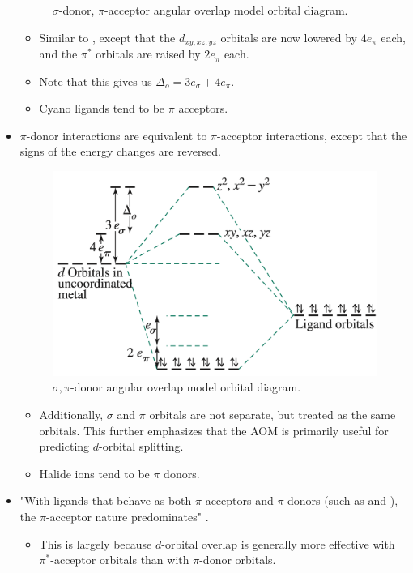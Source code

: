 \documentclass[../notes.tex]{subfiles}
\begin{document}
\begin{itemize}
\begin{figure}[h!]
        \caption{$\sigma$-donor, $\pi$-acceptor  angular overlap model orbital diagram.}
        \label{fig:orbitalDiagram-AOMpiAcc}
    \end{figure}
    \begin{itemize}
        \item Similar to , except that the $d_{xy,xz,yz}$ orbitals are now lowered by $4e_\pi$ each, and the $\pi^*$ orbitals are raised by $2e_\pi$ each.
        \item Note that this gives us $\Delta_o=3e_\sigma+4e_\pi$.
        \item Cyano ligands tend to be $\pi$ acceptors.
    \end{itemize}
    \item $\pi$-donor interactions are equivalent to $\pi$-acceptor interactions, except that the signs of the energy changes are reversed.
    \begin{figure}[h!]
        \centering
        \includegraphics[width=0.45\linewidth]{../ExtFiles/orbitalDiagram-AOMpiDon.png}
        \caption{$\sigma,\pi$-donor  angular overlap model orbital diagram.}
        \label{fig:orbitalDiagram-AOMpiDon}
    \end{figure}
    \begin{itemize}
        \item Additionally, $\sigma$ and $\pi$ orbitals are not separate, but treated as the same orbitals. This further emphasizes that the AOM is primarily useful for predicting $d$-orbital splitting.
        \item Halide ions tend to be $\pi$ donors.
    \end{itemize}
    \item "With ligands that behave as both $\pi$ acceptors and $\pi$ donors (such as  and ), the $\pi$-acceptor nature predominates" \parencite[388]{bib:MiesslerFischerTarr}.
    \begin{itemize}
        \item This is largely because $d$-orbital overlap is generally more effective with $\pi^*$-acceptor orbitals than with $\pi$-donor orbitals.

\end{itemize}
\end{itemize}
\end{document}
